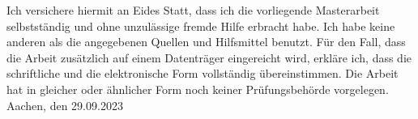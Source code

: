 \documentclass[oneside]{book}
\begin{document}
Ich versichere hiermit an Eides Statt, dass ich die vorliegende Masterarbeit selbstständig und ohne unzulässige fremde Hilfe erbracht habe. Ich habe keine anderen als die angegebenen Quellen und Hilfsmittel benutzt. Für den Fall, dass die Arbeit zusätzlich auf einem Datenträger eingereicht wird, erkläre ich, dass die schriftliche und die elektronische Form vollständig übereinstimmen. Die Arbeit hat in gleicher oder ähnlicher Form noch keiner Prüfungsbehörde vorgelegen. \\

Aachen, den 29.09.2023
\tableofcontents










\end{document}
